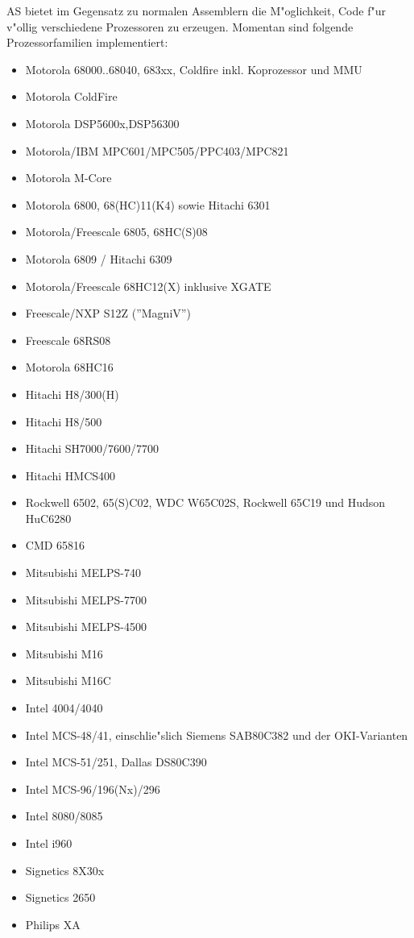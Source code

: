 \documentclass[12pt,a4paper,twoside]{report}
\begin{document}
AS bietet im Gegensatz zu normalen Assemblern die M"oglichkeit, Code
f"ur v"ollig verschiedene Prozessoren zu erzeugen.  Momentan sind
folgende Prozessorfamilien implementiert:
\begin{itemize}
\item{Motorola 68000..68040, 683xx, Coldfire inkl. Koprozessor und MMU}
\item{Motorola ColdFire}
\item{Motorola DSP5600x,DSP56300}
\item{Motorola/IBM MPC601/MPC505/PPC403/MPC821}
\item{Motorola M-Core}
\item{Motorola 6800, 68(HC)11(K4) sowie Hitachi 6301}
\item{Motorola/Freescale 6805, 68HC(S)08}
\item{Motorola 6809 / Hitachi 6309}
\item{Motorola/Freescale 68HC12(X) inklusive XGATE}
\item{Freescale/NXP S12Z (''MagniV'')}
\item{Freescale 68RS08}
\item{Motorola 68HC16}
\item{Hitachi H8/300(H)}
\item{Hitachi H8/500}
\item{Hitachi SH7000/7600/7700}
\item{Hitachi HMCS400}
\item{Rockwell 6502, 65(S)C02, WDC W65C02S, Rockwell 65C19 und
      Hudson HuC6280}
\item{CMD 65816}
\item{Mitsubishi MELPS-740}
\item{Mitsubishi MELPS-7700}
\item{Mitsubishi MELPS-4500}
\item{Mitsubishi M16}
\item{Mitsubishi M16C}
\item{Intel 4004/4040}
\item{Intel MCS-48/41, einschlie"slich Siemens SAB80C382 und der
      OKI-Varianten}
\item{Intel MCS-51/251, Dallas DS80C390}
\item{Intel MCS-96/196(Nx)/296}
\item{Intel 8080/8085}
\item{Intel i960}
\item{Signetics 8X30x}
\item{Signetics 2650}
\item{Philips XA}

\end{itemize}
\end{document}
